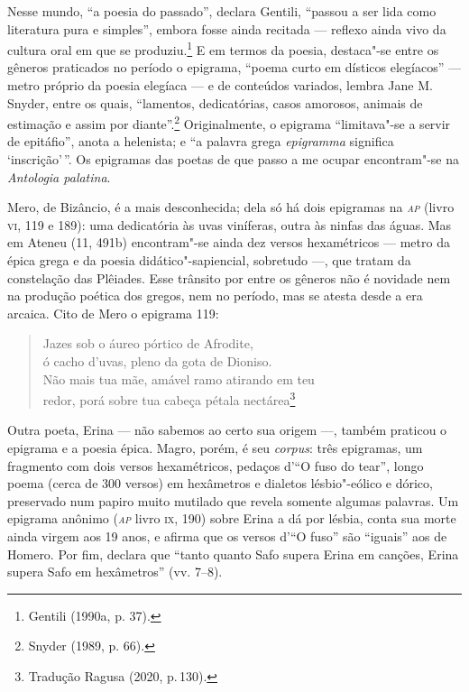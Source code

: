 Nesse mundo, “a poesia do passado”, declara Gentili, “passou a
ser lida como literatura pura e simples”, embora fosse ainda recitada --- reflexo
ainda vivo da cultura oral em que se produziu.\footnote{ Gentili (1990a, p. 37).} E em termos da poesia,
destaca"-se entre os gêneros praticados no período o epigrama, “poema curto em
dísticos elegíacos” --- metro próprio da poesia elegíaca --- e de conteúdos
variados, lembra Jane M. Snyder, entre os quais, “lamentos,
dedicatórias, casos amorosos, animais de estimação e assim por diante”.\footnote{ Snyder (1989, p. 66).}
Originalmente, o epigrama “limitava"-se a servir de epitáfio”, anota a
helenista; e “a palavra grega \textit{epigramma} significa ‘inscrição’\,”. Os
epigramas das poetas de que passo a me ocupar encontram"-se na \textit{Antologia
palatina}.

Mero, de Bizâncio, é a mais desconhecida; dela só há dois epigramas na
\textit{\textsc{ap}} (livro \textsc{vi}, 119 e 189): uma dedicatória às uvas viníferas,
outra às ninfas das águas. Mas em Ateneu (11, 491b) encontram"-se ainda dez
versos hexamétricos --- metro da épica grega e da poesia didático"-sapiencial,
sobretudo ---, que tratam da constelação das Plêiades. Esse trânsito por entre os
gêneros não é novidade nem na produção poética dos gregos, nem no período, mas
se atesta desde a era arcaica.
Cito de Mero o epigrama 119:

\begin{quote}
Jazes sob o áureo pórtico de Afrodite,\\
ó cacho d'uvas, pleno da gota de Dioniso.\\
Não mais tua mãe, amável ramo atirando em teu\\
redor, porá sobre tua cabeça pétala nectárea\footnote{Tradução Ragusa (2020, p.\,130).}
\end{quote}

Outra poeta, Erina --- não sabemos ao certo sua origem ---, também praticou o
epigrama e a poesia épica. Magro, porém, é seu \textit{corpus}: três epigramas, um fragmento com dois versos hexamétricos, pedaços
d’“O fuso do tear”, longo poema (cerca de 300 versos) em hexâmetros e dialetos
lésbio"-eólico e dórico, preservado num papiro muito mutilado que revela somente
algumas palavras. Um epigrama anônimo (\textit{\textsc{ap}} livro \textsc{ix}, 190)
sobre Erina a dá por lésbia, conta sua morte ainda virgem aos 19 anos, e
afirma que os versos d’“O fuso” são ``iguais” aos de Homero. Por fim,
declara que ``tanto quanto Safo supera Erina em canções, Erina supera
Safo em hexâmetros” (vv. 7--8).

